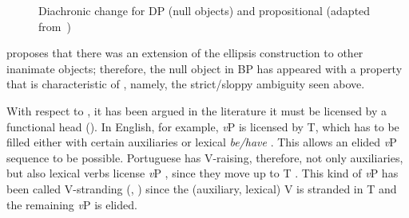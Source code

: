\documentclass[output=paper]{langsci/langscibook}
\begin{document}
\begin{figure}
    \pgfplotstablegetcolsof{\table}
    \pgfmathtruncatemacro{}
    \caption{Diachronic change for DP  (null objects) and propositional
     (adapted from~\citealt{Cyrino1994,Cyrino1997})}%
    \label{fig:27.1}
\end{figure}

\citet{Cyrino1994,Cyrino1997} proposes that there was an extension of the
ellipsis construction to other inanimate objects; therefore, the null object in
BP has appeared with a property that is characteristic of , namely, the
strict/sloppy ambiguity seen above.

With respect to , it has been argued in the literature it must be
licensed by a functional head
(\citealt{Lobeck1995,Kester1996}). In English, for example, \emph{v}P
 is licensed by T, which has to be filled either with certain
auxiliaries or lexical \emph{be/have} \citep{Lobeck1995}. This allows an elided
\emph{v}P sequence to be possible.  Portuguese has V-raising, therefore, not
only auxiliaries, but also lexical verbs license \emph{v}P ,
since they move up to T \parencite{Matos1992,CyrinoMatos2002}. This kind of
\emph{v}P  has been called V-stranding 
(\citealt{Santos2009}, \citealt{Goldberg2005}) since the (auxiliary, lexical) V
is stranded in T and the remaining \emph{v}P is elided.
\end{document}
